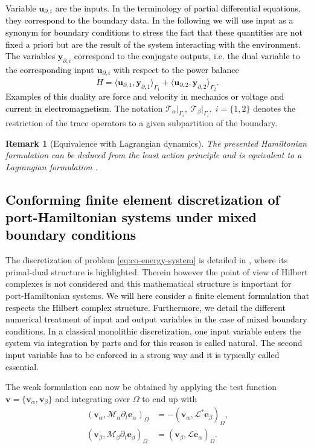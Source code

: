 \documentclass[11pt,a4paper]{article}
\newcommand{\innerproduct}[3][\Omega]{(#2, #3)_{#1}}
\newcommand{\boundary}[3][\partial\Omega]{\langle #2, #3\rangle_{#1}}
\newtheorem{remark}{Remark}
\newcommand{\revone}[1]{{\textcolor{black}{#1}}}
\begin{document}
\revone{Variable $\bm{u}_{\partial, i}$ are the inputs. In the terminology of partial differential equations, they correspond to the boundary data. In the following we will use input as a synonym for boundary conditions to stress the fact that these quantities are not fixed a priori but are the result of the system interacting with the environment. The variables $\bm{y}_{\partial, i}$ correspond to the conjugate outputs, i.e. the dual variable to the corresponding input $\bm{u}_{\partial, i}$ with respect to the power balance
\begin{equation*}
    \dot{H} = \boundary[\Gamma_1]{\bm{u}_{\partial, 1}}{\bm{y}_{\partial, 1}} + \boundary[\Gamma_2]{\bm{u}_{\partial, 2}}{\bm{y}_{\partial, 2}}.
\end{equation*}
Examples of this duality are force and velocity in mechanics or voltage and current in electromagnetism.}  The notation $\mathcal{T}_\alpha\vert_{\Gamma_i}, \; \mathcal{T}_\beta \vert_{\Gamma_i}, \; i=\{1, 2\}$ denotes the restriction of the trace operators to a given subpartition of the boundary.

\begin{remark}[Equivalence with Lagrangian dynamics]
    The presented Hamiltonian formulation can be deduced from the least action principle and is equivalent to a Lagrangian formulation \cite{brugnoli2024OnPhenomena}.
\end{remark}

\subsection{\revone{Conforming finite element discretization of port-Hamiltonian systems under mixed boundary conditions}}
The discretization of problem \eqref{eq:co-energy-system} is detailed in \cite{joly2003}, where its primal-dual structure is highlighted. Therein however the point of view of Hilbert complexes is not considered and this mathematical structure is important for port-Hamiltonian systems. \revone{We will here consider a finite element formulation that respects the Hilbert complex structure. Furthermore, we detail the different numerical treatment of input and output variables in the case of mixed boundary conditions. In a classical monolithic discretization, one input variable enters the system via integration by parts and for this reason is called natural. The second input variable has to be enforced in a strong way and it is typically called essential.}

The weak formulation can now be obtained by applying the test function $\bm{v}=\{\bm{v}_\alpha,\bm{v}_\beta\}$ and integrating over $\Omega$ to end up with
\begin{equation}
    \begin{split}
        \innerproduct{\bm{v}_\alpha}{\mathcal{M}_\alpha \partial_t\bm{e}_{\alpha}} &= -\innerproduct{\bm{v}_\alpha}{\mathcal{L}^*\bm{e}_\beta}, \\
        \innerproduct{\bm{v}_\beta}{\mathcal{M}_\beta \partial_t\bm{e}_{\beta}} &= \innerproduct{\bm{v}_\beta}{\mathcal{L}\bm{e}_\alpha}.
    \end{split}
\end{equation}
\end{document}
